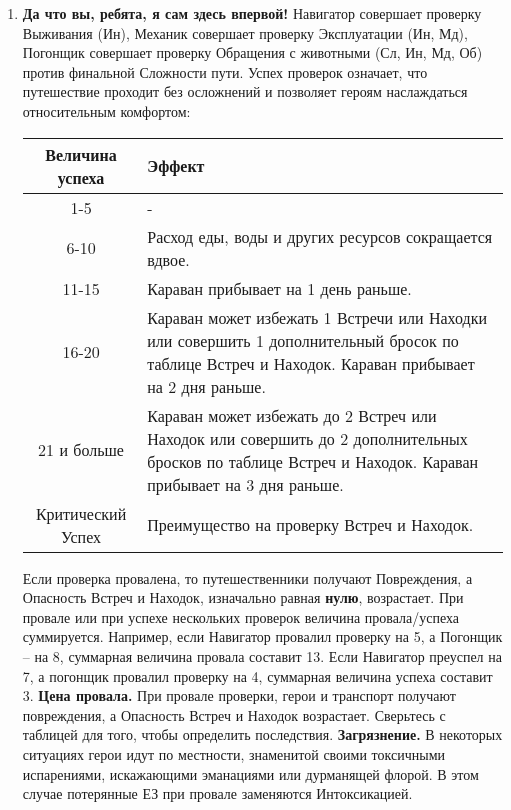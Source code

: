 \begin{enumerate}
\item \textbf{Да что вы, ребята, я сам здесь впервой!} Навигатор совершает проверку Выживания (Ин), Механик совершает проверку Эксплуатации (Ин, Мд), Погонщик совершает проверку Обращения с животными (Сл, Ин, Мд, Об) против финальной Сложности пути.
\newline
Успех проверок означает, что путешествие проходит без осложнений и позволяет героям наслаждаться относительным комфортом:
\begin{center}
\begin{tabular}{|c|p{10cm}|}
\hline
Величина успеха & Эффект \\ \hline
1-5 & - \\ \hline
6-10 & Расход еды, воды и других ресурсов сокращается вдвое. \\ \hline
11-15 & Караван прибывает на 1 день раньше. \\ \hline
16-20 & Караван может избежать 1 Встречи или Находки или совершить 1 дополнительный бросок по таблице Встреч и Находок. Караван прибывает на 2 дня раньше. \\ \hline
21 и больше & Караван может избежать до 2 Встреч или Находок или совершить до 2 дополнительных бросков по таблице Встреч и Находок. Караван прибывает на 3 дня раньше. \\ \hline
Критический Успех & Преимущество на проверку Встреч и Находок. \\ \hline
\end{tabular}
\end{center}
Если проверка провалена, то путешественники получают Повреждения, а Опасность Встреч и Находок, изначально равная \textbf{нулю}, возрастает. При провале или при успехе нескольких проверок величина провала/успеха суммируется. Например, если Навигатор провалил проверку на 5, а Погонщик – на 8, суммарная величина провала составит 13. Если Навигатор преуспел на 7, а погонщик провалил проверку на 4, суммарная величина успеха составит 3.
\newline \textbf{Цена провала.} При провале проверки, герои и транспорт получают повреждения, а Опасность Встреч и Находок возрастает. Сверьтесь с таблицей для того, чтобы определить последствия.
\newline \textbf{Загрязнение.} В некоторых ситуациях герои идут по местности, знаменитой своими токсичными испарениями, искажающими эманациями или дурманящей флорой. В этом случае потерянные ЕЗ при провале заменяются Интоксикацией.
\begin{center}
\begin{tabular}{|c|p{5cm}|p{5cm}|}

\end{tabular}
\end{center}
\end{enumerate}
